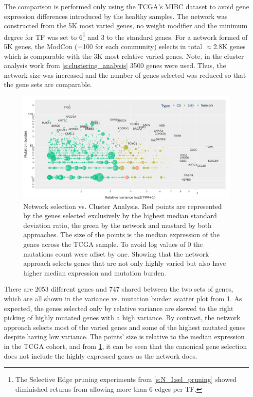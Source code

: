 The comparison is performed only using the TCGA's MIBC dataset to avoid gene expression differences introduced by the healthy samples. The network was constructed from the 5K most varied genes, no weight modifier and the minimum degree for TF  was set to 6\footnote{The Selective Edge pruning experiments from \cref{s:N_I:sel_pruning} showed diminished returns from allowing more than 6 edges per TF.} and 3 to the standard genes. For a network formed of 5K genes, the ModCon (=100 for each community) selects in total $\approx$2.8K genes which is comparable with the 3K most relative varied genes. Note, in the cluster analysis work from \cref{s:clustering_analysis} 3500 genes were used. Thus, the network size was increased and the number of genes selected was reduced so that the gene sets are comparable.

\begin{figure}[!t]    
    \centering\includegraphics[width=1.0\textwidth,keepaspectratio]{Sections/Network_I/Resources/Tum_network/ClusteringAnalysis_vs_Network_3.png}
    \caption[Gene selection: network vs clustering analysis]{Network selection vs. Cluster Analysis. Red points are represented by the genes selected exclusively by the highest median standard deviation ratio, the green by the network and mustard by both approaches. The size of the points is the median expression of the genes across the TCGA sample. To avoid log values of 0 the mutations count were offset by one. Showing that the network approach selects genes that are not only highly varied but also have higher median expression and mutation burden.}
    \label{fig:N_I:network_ca_selection}
\end{figure}

There are 2053 different genes and 747 shared between the two sets of genes, which are all shown in the variance vs. mutation burden scatter plot from \cref{fig:N_I:network_ca_selection}. As expected, the genes selected only by relative variance are skewed to the right picking of highly mutated genes with a high variance. By contrast, the network approach selects most of the varied genes and some of the highest mutated genes despite having low variance. The points' size is relative to the median expression in the TCGA cohort, and from   \cref{fig:N_I:network_ca_selection}, it can be seen that the canonical gene selection does not include the highly expressed genes as the network does.

